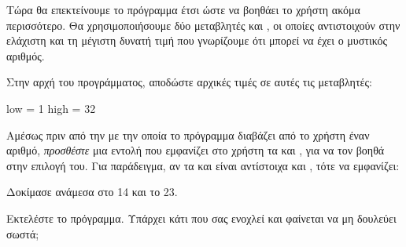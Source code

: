 \documentclass[a4paper,11pt,oneside]{book}
\begin{document}
\begin{step}
Τώρα θα επεκτείνουμε το πρόγραμμα έτσι ώστε να βοηθάει το χρήστη ακόμα περισσότερο. Θα χρησιμοποιήσουμε δύο μεταβλητές  και , οι οποίες αντιστοιχούν στην ελάχιστη και τη μέγιστη δυνατή τιμή που γνωρίζουμε ότι μπορεί να έχει ο μυστικός αριθμός. 

Στην αρχή του προγράμματος, αποδώστε αρχικές τιμές σε αυτές τις μεταβλητές:

\begin{pynew}
low = 1
high = 32
\end{pynew}

\end{step}

\begin{step}
Αμέσως πριν από την  με την οποία το πρόγραμμα διαβάζει από το χρήστη έναν αριθμό, \emph{προσθέστε} μια εντολή που εμφανίζει στο χρήστη τα  και , για να τον βοηθά στην επιλογή του. Για παράδειγμα, αν τα  και  είναι αντίστοιχα  και , τότε να εμφανίζει:

\marginnote[24pt]{\iconcomputer}
\begin{pyterm}
Δοκίμασε ανάμεσα στο 14 και το 23.
\end{pyterm}

Εκτελέστε το πρόγραμμα. Υπάρχει κάτι που σας ενοχλεί και φαίνεται να μη δουλεύει σωστά;

\marginnote[14pt]{\icondiscuss}
\dottedline
\end{step}
\end{document}
